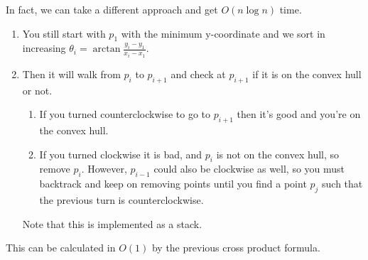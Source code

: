   \begin{example}
    In fact, we can take a different approach and get $O(n \log{n})$ time. 
    \begin{enumerate}
      \item You still start with $p_1$ with the minimum y-coordinate and we sort in increasing $\theta_i = \arctan \frac{y_i - y_1}{x_i - x_1}$. 
      \item Then it will walk from $p_i$ to $p_{i+1}$ and check at $p_{i+1}$ if it is on the convex hull or not. 
        \begin{enumerate}
          \item If you turned counterclockwise to go to $p_{i+1}$ then it's good and you're on the convex hull. 
          \item If you turned clockwise it is bad, and $p_i$ is not on the convex hull, so remove $p_i$. However, $p_{i-1}$ could also be clockwise as well, so you must backtrack and keep on removing points until you find a point $p_j$ such that the previous turn is counterclockwise. 
        \end{enumerate}
        Note that this is implemented as a stack. 
    \end{enumerate}
    This can be calculated in $O(1)$ by the previous cross product formula. 
    \begin{figure}[H]
      \centering 
\end{figure}
\end{example}
